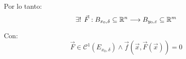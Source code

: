 Por lo tanto:
\begin{equation*}
    \exists ! \hspace{1ex} \Vec{F}: B_{x_0,\delta} \subseteq \mathbb{R}^n \longrightarrow B_{y_0,\varepsilon} \subseteq \mathbb{R}^m
\end{equation*}

Con:
\begin{equation*}
    \Vec{F} \in \mathcal{C}^1(E_{x_0, \delta}) \land \Vec{f}(\Vec{x}, \Vec{F}(\Vec{x}))=0
\end{equation*}